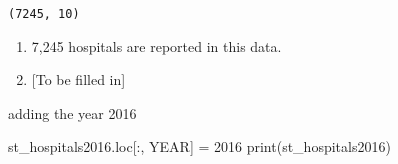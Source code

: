 \documentclass[
  letterpaper,
  DIV=11,
  numbers=noendperiod]{scrartcl}
\newenvironment{Shaded}{\begin{snugshade}}{\end{snugshade}}
\newcommand{\BuiltInTok}[1]{\textcolor[rgb]{0.00,0.23,0.31}{#1}}
\newcommand{\DecValTok}[1]{\textcolor[rgb]{0.68,0.00,0.00}{#1}}
\newcommand{\NormalTok}[1]{\textcolor[rgb]{0.00,0.23,0.31}{#1}}
\newcommand{\OperatorTok}[1]{\textcolor[rgb]{0.37,0.37,0.37}{#1}}
\newcommand{\StringTok}[1]{\textcolor[rgb]{0.13,0.47,0.30}{#1}}
\providecommand{\tightlist}{%
  \setlength{\itemsep}{0pt}\setlength{\parskip}{0pt}}\usepackage{longtable,booktabs,array}
\begin{document}
\begin{verbatim}
(7245, 10)
\end{verbatim}

\begin{enumerate}
\def\labelenumi{\alph{enumi}.}
\tightlist
\item
  7,245 hospitals are reported in this data.
\item
  {[}To be filled in{]}
\end{enumerate}

adding the year 2016

\begin{Shaded}
\begin{Highlighting}[]
\NormalTok{st\_hospitals2016.loc[:, }\StringTok{\textquotesingle{}YEAR\textquotesingle{}}\NormalTok{] }\OperatorTok{=} \DecValTok{2016}
\BuiltInTok{print}\NormalTok{(st\_hospitals2016)}
\end{Highlighting}
\end{Shaded}
\end{document}
